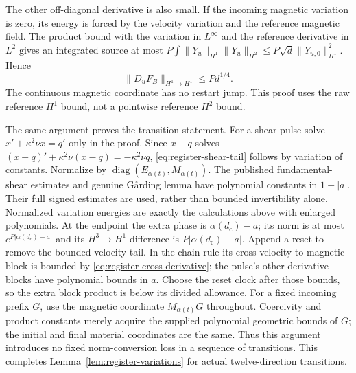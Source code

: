\documentclass[11pt,a4paper]{amsart}
\theoremstyle{definition}
\theoremstyle{remark}
\numberwithin{equation}{section}
\newcommand{\norm}[1]{\lVert #1\rVert}
\begin{document}
The other off-diagonal derivative is also small. If the incoming magnetic
variation is zero, its energy is forced by the velocity variation and the
reference magnetic field. The product bound with the variation in
$L^\infty$ and the reference derivative in $L^2$ gives an integrated source
at most
$P\int\norm{Y_u}_{H^1}\norm{Y_u}_{H^2}
 \le P\sqrt d\norm{Y_{u,0}}_{H^1}^2$.
Hence
\begin{equation}\label{eq:register-cross-derivative}
 \norm{D_uF_B}_{H^1\to H^1}\le Pd^{1/4}.
\end{equation}
The continuous magnetic coordinate has no restart jump. This proof uses
the raw reference $H^1$ bound, not a pointwise reference $H^2$ bound.

The same argument proves the transition statement.  For a shear pulse
solve $x'+\kappa^2\nu x=q'$ only in the proof.  Since $x-q$ solves
$(x-q)'+\kappa^2\nu(x-q)=-\kappa^2\nu q$,
\eqref{eq:register-shear-tail} follows by variation of constants.
Normalize by $\operatorname{diag}(E_{\alpha(t)},M_{\alpha(t)})$.
The published fundamental-shear estimates and genuine G\aa rding lemma
have polynomial constants in $1+|a|$.  Their full signed estimates are
used, rather than bounded invertibility alone.  Normalized variation
energies are exactly the calculations above with enlarged polynomials.
At the endpoint the extra phase is $\alpha(d_{\mathrm c})-a$; its norm is at most
$e^{P|\alpha(d_{\mathrm c})-a|}$ and its $H^3\to H^1$ difference is
$P|\alpha(d_{\mathrm c})-a|$.  Append a reset to remove the bounded velocity tail.
In the chain rule its cross velocity-to-magnetic block is bounded by
\eqref{eq:register-cross-derivative}; the pulse's other derivative blocks
have polynomial bounds in $a$. Choose the reset clock after those bounds,
so the extra block product is below its divided allowance.
For a fixed incoming prefix $G$, use the magnetic coordinate
$M_{\alpha(t)}G$ throughout. Coercivity and product constants merely acquire
the supplied polynomial geometric bounds of $G$; the initial and final
material coordinates are the same. Thus this argument introduces no
fixed norm-conversion loss in a sequence of transitions.
This completes Lemma~\ref{lem:register-variations}
for actual twelve-direction transitions.
\end{document}
